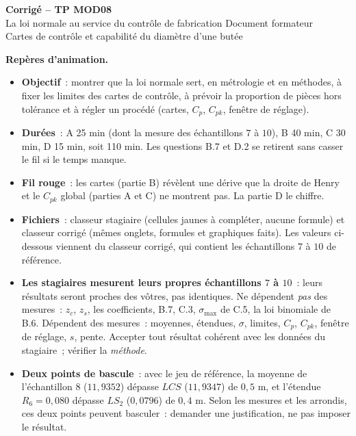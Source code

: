 \documentclass[a4paper,11pt]{article}
\begin{document}
\begin{tcolorbox}[colback=uimmblue, colframe=uimmblue, sharp corners, boxrule=0pt,
  left=14pt, right=14pt, top=8pt, bottom=8pt]
{\color{white}\LARGE\bfseries Corrigé -- TP MOD08}\\[4pt]
{\color{white}\large La loi normale au service du contrôle de fabrication \hfill Document formateur}\\[2pt]
{\color{white}\normalsize Cartes de contrôle et capabilité du diamètre d'une butée}
\end{tcolorbox}

\begin{consigne}\footnotesize
\textbf{Repères d'animation.}
\begin{itemize}[leftmargin=12pt, itemsep=1pt, topsep=2pt]
  \item \textbf{Objectif}~: montrer que la loi normale sert, en métrologie et en méthodes, à fixer les limites des cartes de contrôle, à prévoir la proportion de pièces hors tolérance et à régler un procédé (cartes, $C_p$, $C_{pk}$, fenêtre de réglage).
  \item \textbf{Durées}~: A 25 min (dont la mesure des échantillons $7$ à $10$), B 40 min, C 30 min, D 15 min, soit 110 min. Les questions B.7 et D.2 se retirent sans casser le fil si le temps manque.
  \item \textbf{Fil rouge}~: les cartes (partie B) révèlent une dérive que la droite de Henry et le $C_{pk}$ global (parties A et C) ne montrent pas. La partie D le chiffre.
  \item \textbf{Fichiers}~: classeur stagiaire (cellules jaunes à compléter, aucune formule) et classeur corrigé (mêmes onglets, formules et graphiques faits). Les valeurs ci-dessous viennent du classeur corrigé, qui contient les échantillons $7$ à $10$ de référence.
  \item \textbf{Les stagiaires mesurent leurs propres échantillons $7$ à $10$}~: leurs résultats seront proches des vôtres, pas identiques. Ne dépendent \emph{pas} des mesures~: $z_c$, $z_s$, les coefficients, B.7, C.3, $\sigma_{\max}$ de C.5, la loi binomiale de B.6. Dépendent des mesures~: moyennes, étendues, $\sigma$, limites, $C_p$, $C_{pk}$, fenêtre de réglage, $s$, pente. Accepter tout résultat cohérent avec les données du stagiaire~; vérifier la \emph{méthode}.
  \item \textbf{Deux points de bascule}~: avec le jeu de référence, la moyenne de l'échantillon $8$ ($11{,}9352$) dépasse $LCS$ ($11{,}9347$) de $0{,}5$ \textmu m, et l'étendue $R_6 = 0{,}080$ dépasse $LS_2$ ($0{,}0796$) de $0{,}4$ \textmu m. Selon les mesures et les arrondis, ces deux points peuvent basculer~: demander une justification, ne pas imposer le résultat.

\end{itemize}
\end{consigne}
\end{document}
